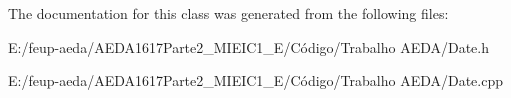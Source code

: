 The documentation for this class was generated from the following files\+:\begin{DoxyCompactItemize}
\item 
E\+:/feup-\/aeda/\+A\+E\+D\+A1617\+Parte2\+\_\+M\+I\+E\+I\+C1\+\_\+\+E/\+Código/\+Trabalho A\+E\+D\+A/Date.\+h\item 
E\+:/feup-\/aeda/\+A\+E\+D\+A1617\+Parte2\+\_\+M\+I\+E\+I\+C1\+\_\+\+E/\+Código/\+Trabalho A\+E\+D\+A/Date.\+cpp\end{DoxyCompactItemize}
